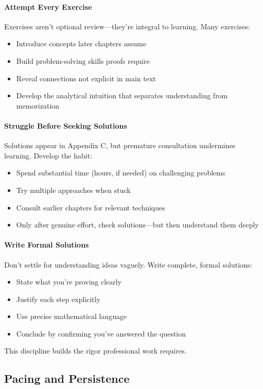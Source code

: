 \paragraph{Attempt Every Exercise}
Exercises aren't optional review—they're integral to learning. Many exercises:
\begin{itemize}
    \item Introduce concepts later chapters assume
    \item Build problem-solving skills proofs require
    \item Reveal connections not explicit in main text
    \item Develop the analytical intuition that separates understanding from memorization
\end{itemize}

\paragraph{Struggle Before Seeking Solutions}
Solutions appear in Appendix C, but premature consultation undermines learning. Develop the habit:
\begin{itemize}
    \item Spend substantial time (hours, if needed) on challenging problems
    \item Try multiple approaches when stuck
    \item Consult earlier chapters for relevant techniques
    \item Only after genuine effort, check solutions—but then understand them deeply
\end{itemize}

\paragraph{Write Formal Solutions}
Don't settle for understanding ideas vaguely. Write complete, formal solutions:
\begin{itemize}
    \item State what you're proving clearly
    \item Justify each step explicitly
    \item Use precise mathematical language
    \item Conclude by confirming you've answered the question
\end{itemize}

This discipline builds the rigor professional work requires.

\subsection{Pacing and Persistence}


